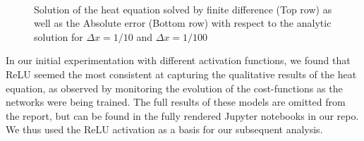 \documentclass[reprint, english, nofootinbib]{revtex4-2}
\begin{document}
\begin{figure}[h!tb]
    \center
    \\
    \caption{\label{fig:fw euler PDE error}Solution of the heat equation solved by finite difference (Top row) as well as the  Absolute error (Bottom row) with respect to the analytic solution for $\Delta x = 1/10$ and $\Delta x = 1/100$}
\end{figure}

In our initial experimentation with different activation functions, we found that ReLU seemed the most consistent at capturing the qualitative results of the heat equation, as observed by monitoring the evolution of the cost-functions as the networks were being trained. The full results of these models are omitted from the report, but can be found in the fully rendered Jupyter notebooks in our repo. We thus used the ReLU activation as a basis for our subsequent analysis.
\end{document}
